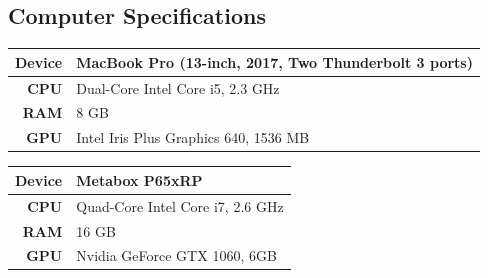 \documentclass[11pt]{article}
\begin{document}
\newpage


\begin{appendices}

  \section{Computer Specifications}\label{app:pc-spec}

  \begin{table}[h!]
    \begin{tabular}{rl}
      \textbf{Device} & MacBook Pro (13-inch, 2017, Two Thunderbolt 3 ports) \\ \hline
      \textbf{CPU}    & Dual-Core Intel Core i5, 2.3 GHz                     \\ \hline
      \textbf{RAM}    & 8 GB                                                 \\ \hline
      \textbf{GPU}    & Intel Iris Plus Graphics 640, 1536 MB
    \end{tabular}
  \end{table}

  \begin{table}[h!]
    \begin{tabular}{rl}
      \textbf{Device} & Metabox P65xRP                   \\ \hline
      \textbf{CPU}    & Quad-Core Intel Core i7, 2.6 GHz \\ \hline
      \textbf{RAM}    & 16 GB                            \\ \hline
      \textbf{GPU}    & Nvidia GeForce GTX 1060, 6GB
    \end{tabular}
  \end{table}

\end{appendices}
\end{document}
